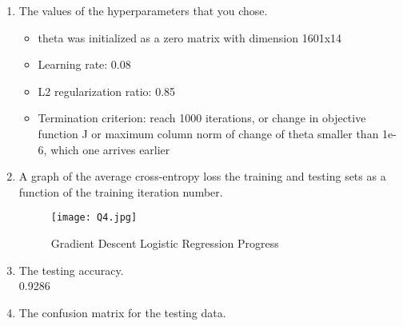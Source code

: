 \documentclass[12pt]{article}
\begin{document}
\begin{enumerate}
\item The values of the hyperparameters that you chose.
\begin{itemize}
\item theta was initialized as a zero matrix with dimension 1601x14
\item Learning rate: 0.08
\item L2 regularization ratio: 0.85
\item Termination criterion:  reach 1000 iterations, or change in objective function J or maximum column norm of change of theta smaller than 1e-6, which one arrives earlier
\end{itemize}
   
\item A graph of the average cross-entropy loss the training and testing sets as a function of the training iteration number.
\begin{figure}[H]
\begin{center}
\texttt{[image: Q4.jpg]}
\caption{Gradient Descent Logistic Regression Progress}
\end{center}
\end{figure}
\newpage
\item The testing accuracy.\\

0.9286  
\item The confusion matrix for the testing data.



\end{enumerate}
\end{document}
